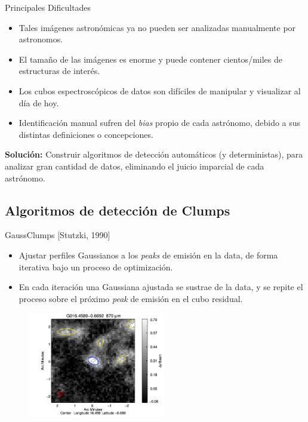 \documentclass{beamer}
\begin{document}
\begin{frame}{Principales Dificultades}
\begin{itemize}
  \item Tales imágenes astronómicas ya no pueden ser analizadas manualmente por astronomos.
  \item El tamaño de las imágenes es enorme y puede contener cientos/miles de estructuras de interés.
  \item Los cubos espectroscópicos de datos son difíciles de manipular y visualizar al día de hoy.
  \item Identificación manual sufren del \textit{bias} propio de cada astrónomo, debido a sus distintas definiciones o concepciones.
\end{itemize}

\textbf{Solución:} Construir algoritmos de detección automáticos (y deterministas), para analizar gran cantidad de datos, eliminando el juicio imparcial de cada astrónomo.  
\end{frame}





\subsection{Algoritmos de detección de Clumps}

\begin{frame}{GaussClumps [Stutzki, 1990]}
\begin{itemize}
  \item Ajustar perfiles Gaussianos a los \textit{peaks} de emisión en la data, de forma iterativa bajo un proceso de optimización.
  \item En cada iteración una Gaussiana ajustada se sustrae de la data, y se repite el proceso sobre el próximo \textit{peak} de emisión en el cubo residual.
\end{itemize}
\begin{figure}[htpb!]
\centering
\includegraphics[width=6cm]{gc}
\end{figure}
\end{frame}
\end{document}
